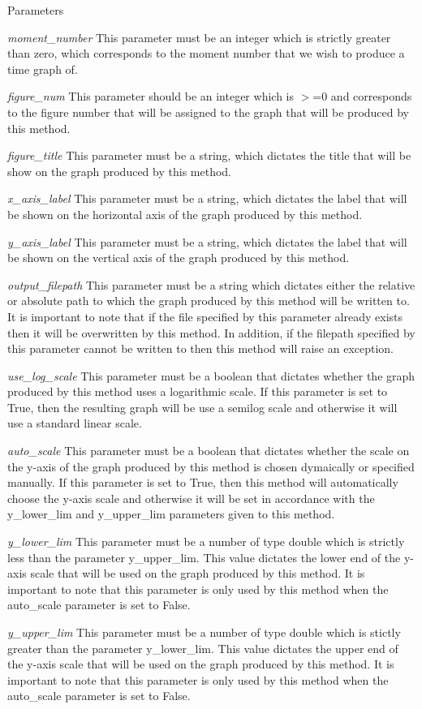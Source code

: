 \begin{DoxyParams}{Parameters}
\item[{\em moment\_\-number}]This parameter must be an integer which is strictly greater than zero, which corresponds to the moment number that we wish to produce a time graph of. \item[{\em figure\_\-num}]This parameter should be an integer which is $>$=0 and corresponds to the figure number that will be assigned to the graph that will be produced by this method. \item[{\em figure\_\-title}]This parameter must be a string, which dictates the title that will be show on the graph produced by this method. \item[{\em x\_\-axis\_\-label}]This parameter must be a string, which dictates the label that will be shown on the horizontal axis of the graph produced by this method. \item[{\em y\_\-axis\_\-label}]This parameter must be a string, which dictates the label that will be shown on the vertical axis of the graph produced by this method. \item[{\em output\_\-filepath}]This parameter must be a string which dictates either the relative or absolute path to which the graph produced by this method will be written to. It is important to note that if the file specified by this parameter already exists then it will be overwritten by this method. In addition, if the filepath specified by this parameter cannot be written to then this method will raise an exception. \item[{\em use\_\-log\_\-scale}]This parameter must be a boolean that dictates whether the graph produced by this method uses a logarithmic scale. If this parameter is set to True, then the resulting graph will be use a semilog scale and otherwise it will use a standard linear scale. \item[{\em auto\_\-scale}]This parameter must be a boolean that dictates whether the scale on the y-\/axis of the graph produced by this method is chosen dymaically or specified manually. If this parameter is set to True, then this method will automatically choose the y-\/axis scale and otherwise it will be set in accordance with the y\_\-lower\_\-lim and y\_\-upper\_\-lim parameters given to this method. \item[{\em y\_\-lower\_\-lim}]This parameter must be a number of type double which is strictly less than the parameter y\_\-upper\_\-lim. This value dictates the lower end of the y-\/axis scale that will be used on the graph produced by this method. It is important to note that this parameter is only used by this method when the auto\_\-scale parameter is set to False. \item[{\em y\_\-upper\_\-lim}]This parameter must be a number of type double which is stictly greater than the parameter y\_\-lower\_\-lim. This value dictates the upper end of the y-\/axis scale that will be used on the graph produced by this method. It is important to note that this parameter is only used by this method when the auto\_\-scale parameter is set to False. \end{DoxyParams}

